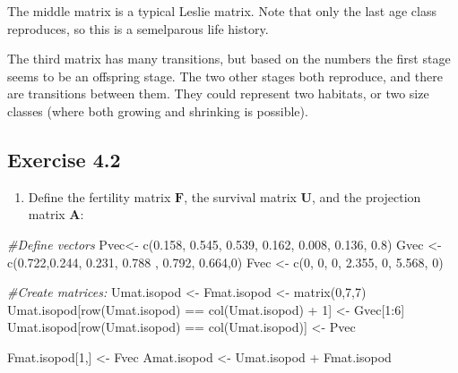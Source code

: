 \documentclass[
]{book}
\newenvironment{Shaded}{\begin{snugshade}}{\end{snugshade}}
\newcommand{\CommentTok}[1]{\textcolor[rgb]{0.56,0.35,0.01}{\textit{#1}}}
\newcommand{\DecValTok}[1]{\textcolor[rgb]{0.00,0.00,0.81}{#1}}
\newcommand{\FloatTok}[1]{\textcolor[rgb]{0.00,0.00,0.81}{#1}}
\newcommand{\FunctionTok}[1]{\textcolor[rgb]{0.00,0.00,0.00}{#1}}
\newcommand{\NormalTok}[1]{#1}
\newcommand{\OtherTok}[1]{\textcolor[rgb]{0.56,0.35,0.01}{#1}}
\newcommand{\SpecialCharTok}[1]{\textcolor[rgb]{0.00,0.00,0.00}{#1}}
\providecommand{\tightlist}{%
  \setlength{\itemsep}{0pt}\setlength{\parskip}{0pt}}
\begin{document}
The middle matrix is a typical Leslie matrix. Note that only the last age class reproduces, so this is a semelparous life history.

The third matrix has many transitions, but based on the numbers the first stage seems to be an offspring stage. The two other stages both reproduce, and there are transitions between them. They could represent two habitats, or two size classes (where both growing and shrinking is possible).

\hypertarget{exercise-4.2-1}{%
\subsection*{Exercise 4.2}\label{exercise-4.2-1}}

\begin{enumerate}
\def\labelenumi{\arabic{enumi}.}
\tightlist
\item
  Define the fertility matrix \(\mathbf{F}\), the survival matrix \(\mathbf{U}\), and the projection matrix \(\mathbf{A}\):
\end{enumerate}

\begin{Shaded}
\begin{Highlighting}[]
\CommentTok{\#Define vectors}
\NormalTok{Pvec}\OtherTok{\textless{}{-}} \FunctionTok{c}\NormalTok{(}\FloatTok{0.158}\NormalTok{, }\FloatTok{0.545}\NormalTok{, }\FloatTok{0.539}\NormalTok{, }\FloatTok{0.162}\NormalTok{, }\FloatTok{0.008}\NormalTok{, }\FloatTok{0.136}\NormalTok{, }\FloatTok{0.8}\NormalTok{)}
\NormalTok{Gvec }\OtherTok{\textless{}{-}} \FunctionTok{c}\NormalTok{(}\FloatTok{0.722}\NormalTok{,}\FloatTok{0.244}\NormalTok{, }\FloatTok{0.231}\NormalTok{, }\FloatTok{0.788}\NormalTok{ , }\FloatTok{0.792}\NormalTok{, }\FloatTok{0.664}\NormalTok{,}\DecValTok{0}\NormalTok{)}
\NormalTok{Fvec }\OtherTok{\textless{}{-}} \FunctionTok{c}\NormalTok{(}\DecValTok{0}\NormalTok{, }\DecValTok{0}\NormalTok{, }\DecValTok{0}\NormalTok{, }\FloatTok{2.355}\NormalTok{, }\DecValTok{0}\NormalTok{, }\FloatTok{5.568}\NormalTok{, }\DecValTok{0}\NormalTok{)}

\CommentTok{\#Create matrices:}
\NormalTok{Umat.isopod }\OtherTok{\textless{}{-}}\NormalTok{ Fmat.isopod }\OtherTok{\textless{}{-}} \FunctionTok{matrix}\NormalTok{(}\DecValTok{0}\NormalTok{,}\DecValTok{7}\NormalTok{,}\DecValTok{7}\NormalTok{)}
\NormalTok{Umat.isopod[}\FunctionTok{row}\NormalTok{(Umat.isopod) }\SpecialCharTok{==} \FunctionTok{col}\NormalTok{(Umat.isopod) }\SpecialCharTok{+} \DecValTok{1}\NormalTok{] }\OtherTok{\textless{}{-}}\NormalTok{ Gvec[}\DecValTok{1}\SpecialCharTok{:}\DecValTok{6}\NormalTok{]}
\NormalTok{Umat.isopod[}\FunctionTok{row}\NormalTok{(Umat.isopod) }\SpecialCharTok{==} \FunctionTok{col}\NormalTok{(Umat.isopod)] }\OtherTok{\textless{}{-}}\NormalTok{ Pvec}

\NormalTok{Fmat.isopod[}\DecValTok{1}\NormalTok{,] }\OtherTok{\textless{}{-}}\NormalTok{ Fvec}
\NormalTok{Amat.isopod }\OtherTok{\textless{}{-}}\NormalTok{ Umat.isopod }\SpecialCharTok{+}\NormalTok{ Fmat.isopod}
\end{Highlighting}
\end{Shaded}
\end{document}
